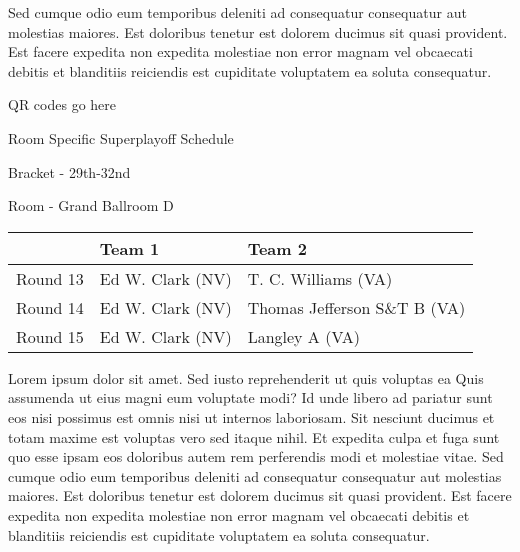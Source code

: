 \documentclass{article}%
\begin{document}
\newline%
Sed cumque odio eum temporibus deleniti ad consequatur consequatur aut molestias maiores. Est doloribus tenetur est dolorem ducimus sit quasi provident. Est facere expedita non expedita molestiae non error magnam vel obcaecati debitis et blanditiis reiciendis est cupiditate voluptatem ea soluta consequatur.%
\vspace*{140pt}%
\begin{center}%
\begin{Huge}%
QR codes go here%
\end{Huge}%
\end{center}%
\newpage%
\begin{center}%
\begin{Huge}%
Room Specific Superplayoff Schedule%
\end{Huge}%
\vspace*{8pt}%
\linebreak%
\begin{Large}%
Bracket {-} 29th{-}32nd%
\end{Large}%
\vspace*{8pt}%
\linebreak%
\vspace*{8pt}%
\begin{Large}%
Room {-} Grand Ballroom D%
\end{Large}%
\end{center}%
%
\begin{tabularx}{\textwidth}{|c|Y|Y|}%
\hline%
&Team 1&Team 2\\%
\hline%
Round 13&Ed W. Clark (NV)&T. C. Williams (VA)\\%
Round 14&Ed W. Clark (NV)&Thomas Jefferson S\&T B (VA)\\%
Round 15&Ed W. Clark (NV)&Langley A (VA)\\%
\hline%
\end{tabularx}%
\vspace*{8pt}%
\newline%
Lorem ipsum dolor sit amet. Sed iusto reprehenderit ut quis voluptas ea Quis assumenda ut eius magni eum voluptate modi? Id unde libero ad pariatur sunt eos nisi possimus est omnis nisi ut internos laboriosam. Sit nesciunt ducimus et totam maxime est voluptas vero sed itaque nihil. Et expedita culpa et fuga sunt quo esse ipsam eos doloribus autem rem perferendis modi et molestiae vitae.\newline%
\newline%
Sed cumque odio eum temporibus deleniti ad consequatur consequatur aut molestias maiores. Est doloribus tenetur est dolorem ducimus sit quasi provident. Est facere expedita non expedita molestiae non error magnam vel obcaecati debitis et blanditiis reiciendis est cupiditate voluptatem ea soluta consequatur.%
\end{document}
